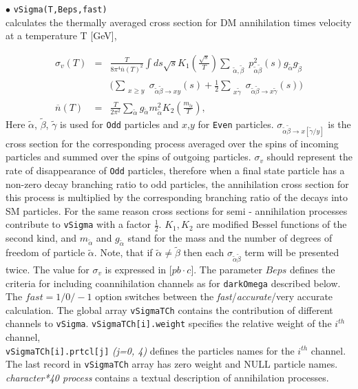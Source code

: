\documentclass[12pt,a4paper]{article}
\begin{document}
\noindent
$\bullet$ \verb|vSigma(T,Beps,fast)|\\
calculates the thermally averaged cross section for DM annihilation  times velocity  
at a  temperature T [GeV],

\begin{eqnarray}
\nonumber
\sigma_v(T) &=& \frac{T}{8\pi^4  \overline{n}(T)^2} \int ds\sqrt{s} K_1\left(\frac{\sqrt{s}}{T}\right)   
\sum_{\substack{
\tilde\alpha ,\tilde\beta }}  p_{\tilde\alpha\tilde\beta}^2(s) g_{\tilde\alpha} g_{\tilde\beta} \\
&&\big(
\sum_{\substack{ x \ge y }}  
 {\sigma}_{\tilde\alpha\tilde\beta\to x y}(s)+ \frac{1}{2}\sum_{\substack{x  \tilde\gamma }}
 {\sigma}_{\tilde\alpha\tilde\beta\to x\tilde\gamma}(s)
  \big)
\label{sigmaV}\\
\overline{n}(T)&=&\frac{T}{2\pi^2 } \sum_{\tilde\alpha} g_{\tilde\alpha} m^2_{\tilde\alpha} K_2(\frac{m_{\tilde\alpha}}{T}),
\end{eqnarray}
Here  $\tilde\alpha$, $\tilde\beta$, $\tilde\gamma$  is used for  {\tt Odd} particles and $x$,$y$
for {\tt Even}  particles.    ${\sigma}_{\tilde\alpha\tilde\beta\to x[\tilde\gamma/y]} $ is the cross section for the 
corresponding  process  averaged over the spins of incoming particles and summed
over the spins of outgoing particles. $\sigma_v$  should represent the rate of disappearance  of  {\tt Odd} particles, therefore
when a final state particle has a non-zero decay branching ratio to odd particles, the  annihilation cross section for this process is multiplied by the corresponding branching ratio of the decays into SM particles. For the same reason cross sections for  semi - annihilation processes  contribute to {\tt vSigma} with a factor $\frac{1}{2}$. $K_1,K_2$ are modified Bessel functions of the second kind, and 
$m_{\tilde\alpha}$ and $g_{\tilde\alpha}$ stand for the  mass and the number of degrees of freedom of particle $\tilde\alpha$.
Note, that if $\tilde\alpha \ne \tilde\beta$ then each
${\sigma}_{\tilde\alpha\tilde\beta}$ term will be presented  twice.
The value for $\sigma_v$ 
is expressed in [$pb\cdot c$].  The parameter $Beps$ defines the criteria for including coannihilation
channels as for {\tt darkOmega} described below.
The $fast=1/0/-1$ option switches between the {\it fast}/{\it accurate}/{very accurate} calculation. 
The global array {\tt vSigmaTCh} contains the 
contribution of different channels to {\tt vSigma}. \verb|vSigmaTCh[i].weight| specifies the relative
weight of the $i^{th}$ channel, \\
\verb|vSigmaTCh[i].prtcl[j]|  {\it (j=0, 4)}  defines the particles names for the $i^{th}$
channel.\\
The last record in \verb|vSigmaTCh| array has zero weight and 
NULL particle names.  {\it character*40  process}
contains a textual description of annihilation processes.\\
\end{document}
